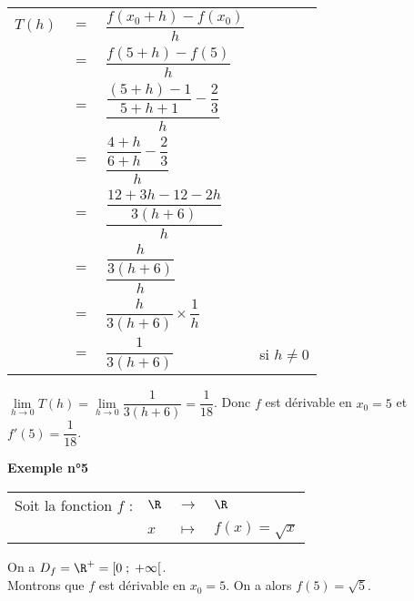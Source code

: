 \begin{tabular}{llll}
$T(h)$ & $=$ & $\dfrac{f(x_0 + h) - f(x_0)}{h}$ & \vspace*{.3cm} \\
& $=$ & $\dfrac{f(5 + h) - f(5)}{h}$ & \vspace*{.3cm} \\
& $=$ & $\dfrac{ \dfrac{\left(5+h\right)-1}{5 + h + 1} - \dfrac{2}{3}}{h}$ & \vspace*{.3cm} \\
& $=$ & $\dfrac{\dfrac{4+h}{6+h} - \dfrac{2}{3}}{h}$ & \vspace*{.3cm} \\
& $=$ & $\dfrac{\dfrac{12 + 3h - 12 - 2h}{3(h+6)}}{h}$ & \vspace*{.3cm} \\
& $=$ & $\dfrac{\dfrac{h}{3(h+6)}}{h}$ & \vspace*{.3cm} \\
& $=$ & $\dfrac{h}{3(h+6)} \times \dfrac{1}{h}$ & \vspace*{.3cm} \\
& $=$ & $\dfrac{1}{3\left(h+6\right)}$ & si $h \neq 0$ \\
\end{tabular}

\vspace*{.3cm}

$\lim\limits_{h \to 0} T(h) = \lim\limits_{h \to 0} \dfrac{1}{3\left(h+6\right)} = \dfrac{1}{18}$. Donc $f$ est dérivable en $x_0 = 5$ et $f'(5) = \dfrac{1}{18}$. \\

\newpage

\textbf{Exemple n°5} \\

\begin{tabular}{llll}
Soit la fonction $f$ : & $\R$ & $\longrightarrow$ & $\R$ \\
& $x$ & $\longmapsto$ & $f\left(x\right) = \sqrt{x}$ \\
\end{tabular}

On a $D_f = \R^+ = \left[0 \; ; \; +\infty\right[$. \\

Montrons que $f$ est dérivable en $x_0 = 5$. On a alors $f(5) = \sqrt{5}$. \\


